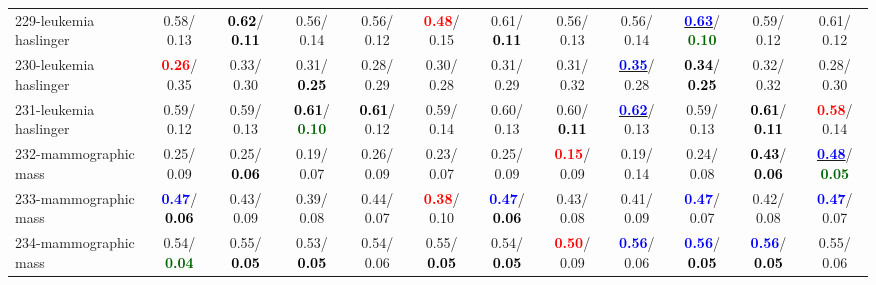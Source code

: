 \begin{table}[h]
\begin{center}
{\begin{tabular}{lc|c|c|c|c|c|c|c|c|c|c}
229-leukemia haslinger &   0.58/  0.13 & \textcolor{black}{\textbf{  0.62}}/\textcolor{black}{\textbf{  0.11}} &   0.56/  0.14 &   0.56/  0.12 & \textcolor{red}{\textbf{  0.48}}/  0.15 &   0.61/\textcolor{black}{\textbf{  0.11}} &   0.56/  0.13 &   0.56/  0.14 & \underline{\textcolor{blue}{\textbf{  0.63}}}/\textcolor{darkgreen}{\textbf{  0.10}} &   0.59/  0.12 &   0.61/  0.12 \\
230-leukemia haslinger & \textcolor{red}{\textbf{  0.26}}/  0.35 &   0.33/  0.30 &   0.31/\textcolor{black}{\textbf{  0.25}} &   0.28/  0.29 &   0.30/  0.28 &   0.31/  0.29 &   0.31/  0.32 & \underline{\textcolor{blue}{\textbf{  0.35}}}/  0.28 & \textcolor{black}{\textbf{  0.34}}/\textcolor{black}{\textbf{  0.25}} &   0.32/  0.32 &   0.28/  0.30 \\
231-leukemia haslinger &   0.59/  0.12 &   0.59/  0.13 & \textcolor{black}{\textbf{  0.61}}/\textcolor{darkgreen}{\textbf{  0.10}} & \textcolor{black}{\textbf{  0.61}}/  0.12 &   0.59/  0.14 &   0.60/  0.13 &   0.60/\textcolor{black}{\textbf{  0.11}} & \underline{\textcolor{blue}{\textbf{  0.62}}}/  0.13 &   0.59/  0.13 & \textcolor{black}{\textbf{  0.61}}/\textcolor{black}{\textbf{  0.11}} & \textcolor{red}{\textbf{  0.58}}/  0.14 \\ \hline
232-mammographic mass &   0.25/  0.09 &   0.25/\textcolor{black}{\textbf{  0.06}} &   0.19/  0.07 &   0.26/  0.09 &   0.23/  0.07 &   0.25/  0.09 & \textcolor{red}{\textbf{  0.15}}/  0.09 &   0.19/  0.14 &   0.24/  0.08 & \textcolor{black}{\textbf{  0.43}}/\textcolor{black}{\textbf{  0.06}} & \underline{\textcolor{blue}{\textbf{  0.48}}}/\textcolor{darkgreen}{\textbf{  0.05}} \\
233-mammographic mass & \textcolor{blue}{\textbf{  0.47}}/\textcolor{black}{\textbf{  0.06}} &   0.43/  0.09 &   0.39/  0.08 &   0.44/  0.07 & \textcolor{red}{\textbf{  0.38}}/  0.10 & \textcolor{blue}{\textbf{  0.47}}/\textcolor{black}{\textbf{  0.06}} &   0.43/  0.08 &   0.41/  0.09 & \textcolor{blue}{\textbf{  0.47}}/  0.07 &   0.42/  0.08 & \textcolor{blue}{\textbf{  0.47}}/  0.07 \\
234-mammographic mass &   0.54/\textcolor{darkgreen}{\textbf{  0.04}} &   0.55/\textcolor{black}{\textbf{  0.05}} &   0.53/\textcolor{black}{\textbf{  0.05}} &   0.54/  0.06 &   0.55/\textcolor{black}{\textbf{  0.05}} &   0.54/\textcolor{black}{\textbf{  0.05}} & \textcolor{red}{\textbf{  0.50}}/  0.09 & \textcolor{blue}{\textbf{  0.56}}/  0.06 & \textcolor{blue}{\textbf{  0.56}}/\textcolor{black}{\textbf{  0.05}} & \textcolor{blue}{\textbf{  0.56}}/\textcolor{black}{\textbf{  0.05}} &   0.55/  0.06 \\

\end{tabular}}
\end{center}
\end{table}
